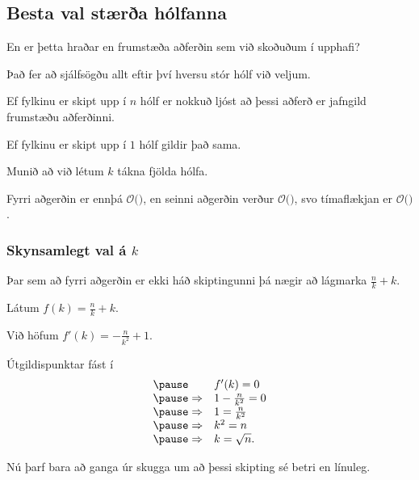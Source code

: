 \subsection{Besta val stærða hólfanna}
{
    {
        \item<1-> En er þetta hraðar en frumstæða aðferðin sem við skoðuðum í upphafi?
        \item<2-> Það fer að sjálfsögðu allt eftir því hversu stór hólf við veljum.
        \item<3-> Ef fylkinu er skipt upp í $n$ hólf er nokkuð ljóst að þessi aðferð er jafngild frumstæðu aðferðinni.
        \item<4-> Ef fylkinu er skipt upp í $1$ hólf gildir það sama.
        \item<5-> Munið að við létum $k$ tákna fjölda hólfa.
        \item<6-> Fyrri aðgerðin er ennþá $\mathcal{O}($$)$,
            en seinni aðgerðin verður $\mathcal{O}($$)$,
            svo tímaflækjan er $\mathcal{O}($$)$.
    }
}

{
    \frametitle{Skynsamlegt val á $k$}
    {
        \item Þar sem að fyrri aðgerðin er ekki háð skiptingunni þá nægir að lágmarka $\frac{n}{k} + k$.
        \pause\item Látum $f(k) = \frac{n}{k} + k$.
        \pause\item Við höfum $f'(k) = -\frac{n}{k^2} + 1$.
        \pause\item Útgildispunktar fást í
            \[
                \begin{array}{l l}
                \pause& f'(k) = 0\\
                \pause\Rightarrow & 1 - \frac{n}{k^2} = 0\\
                \pause\Rightarrow & 1 = \frac{n}{k^2}\\
                \pause\Rightarrow & k^2 = n\\
                \pause\Rightarrow & k = \sqrt{n}.
            \end{array}
            \]
        \pause\item Nú þarf bara að ganga úr skugga um að þessi skipting sé betri en línuleg.
}
}

